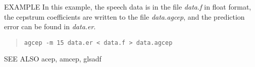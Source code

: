 \begin{options}
\end{options}

\begin{qsection}{EXAMPLE}
	In this example, the speech data is in the file {\em data.f}
        in float format, the cepstrum coefficients are written to
        the file {\em data.agcep},
        and the prediction error can be found in {\em data.er}.
\begin{quote}
 \verb!agcep -m 15 data.er < data.f > data.agcep!
\end{quote} 
\end{qsection}

\begin{qsection}{SEE ALSO}
acep, amcep, glsadf
\end{qsection}
